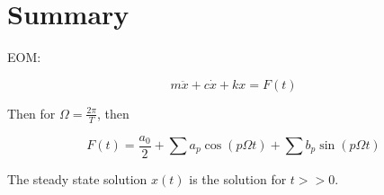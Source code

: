 \documentclass{article}
\newtheorem{one minute paper}[theorem]{One Minute Paper}
\begin{document}
\section*{Summary}

EOM:

\begin{equation}
    m\ddot{x} + c\dot{x} + kx = F(t)
\end{equation}

Then for $\Omega = \frac{2\pi}{T}$, then 

\begin{equation}
    F(t) = \frac{a_0}{2} + \sum a_p\cos(p\Omega t) + \sum b_p\sin(p\Omega t)
\end{equation}

The steady state solution $x(t)$ is the solution for $t >> 0$. 
\end{document}
